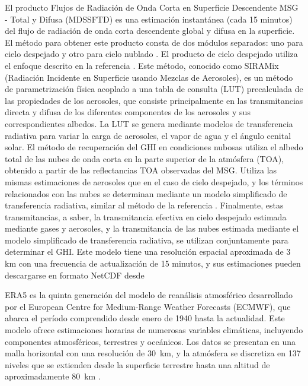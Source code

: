 \documentclass[letterpaper,12pt, twoside]{report}
\providecommand{\DIFdeltex}[1]{{\protect\color{red} \scriptsize #1}} %
\providecommand{\DIFdel}[1]{\texorpdfstring{\DIFdeltex{#1}}{}} %
\begin{document}
\DIFdel{El producto Flujos de Radiación de Onda Corta en Superficie Descendente MSG - Total y Difusa (MDSSFTD) es una estimación instantánea (cada 15 minutos) del flujo de radiación de onda corta descendente global y difusa en la superficie. El método para obtener este producto consta de dos módulos separados: uno para cielo despejado y otro para cielo nublado \citep{Derrien2005,nwc-2014}. El producto de cielo despejado utiliza el enfoque descrito en la referencia \citep{Ceamanos2014}. Este método, conocido como SIRAMix (Radiación Incidente en Superficie usando Mezclas de Aerosoles), es un método de parametrización física acoplado a una tabla de consulta (LUT) precalculada de las propiedades de los aerosoles, que consiste principalmente en las transmitancias directa y difusa de los diferentes componentes de los aerosoles y sus correspondientes albedos. La LUT se genera mediante modelos de transferencia radiativa para variar la carga de aerosoles, el vapor de agua y el ángulo cenital solar. El método de recuperación del GHI en condiciones nubosas utiliza el albedo total de las nubes de onda corta en la parte superior de la atmósfera (TOA), obtenido a partir de las reflectancias TOA observadas del MSG. Utiliza las mismas estimaciones de aerosoles que en el caso de cielo despejado, y los términos relacionados con las nubes se determinan mediante un modelo simplificado de transferencia radiativa, similar al método de la referencia \citep{Geiger2008}. Finalmente, estas transmitancias, a saber, la transmitancia efectiva en cielo despejado estimada mediante gases y aerosoles, y la transmitancia de las nubes estimada mediante el modelo simplificado de transferencia radiativa, se utilizan conjuntamente para determinar el GHI. Este modelo tiene una resolución espacial aproximada de 3 km con una frecuencia de actualización de 15 minutos, y sus estimaciones pueden descargarse en formato NetCDF desde }%

\DIFdel{ERA5 es la quinta generación del modelo de reanálisis atmosférico desarrollado por el European Centre for Medium-Range Weather Forecasts (ECMWF), que abarca el período comprendido desde enero de 1940 hasta la actualidad. Este modelo ofrece estimaciones horarias de numerosas variables climáticas, incluyendo componentes atmosféricos, terrestres y oceánicos. Los datos se presentan en una malla horizontal con una resolución de $30$~km, y la atmósfera se discretiza en 137 niveles que se extienden desde la superficie terrestre hasta una altitud de aproximadamente $80$~km \citep{era-5}. 
}%
\end{document}
